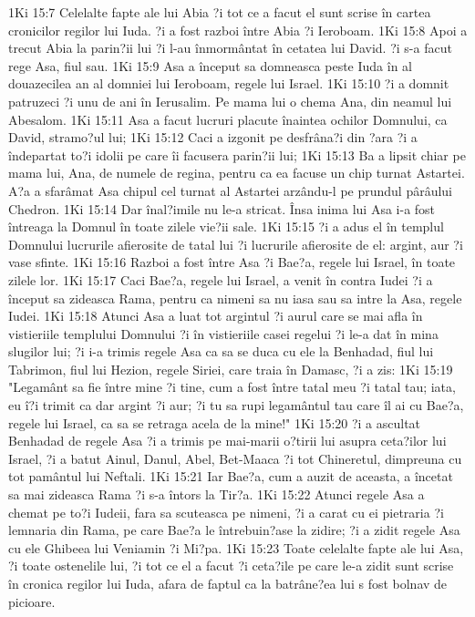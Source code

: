 1Ki 15:7  Celelalte fapte ale lui Abia ?i tot ce a facut el sunt scrise în cartea cronicilor regilor lui Iuda. ?i a fost razboi între Abia ?i Ieroboam.
1Ki 15:8  Apoi a trecut Abia la parin?ii lui ?i l-au înmormântat în cetatea lui David. ?i s-a facut rege Asa, fiul sau.
1Ki 15:9  Asa a început sa domneasca peste Iuda în al douazecilea an al domniei lui Ieroboam, regele lui Israel.
1Ki 15:10  ?i a domnit patruzeci ?i unu de ani în Ierusalim. Pe mama lui o chema Ana, din neamul lui Abesalom.
1Ki 15:11  Asa a facut lucruri placute înaintea ochilor Domnului, ca David, stramo?ul lui;
1Ki 15:12  Caci a izgonit pe desfrâna?i din ?ara ?i a îndepartat to?i idolii pe care îi facusera parin?ii lui;
1Ki 15:13  Ba a lipsit chiar pe mama lui, Ana, de numele de regina, pentru ca ea facuse un chip turnat Astartei. A?a a sfarâmat Asa chipul cel turnat al Astartei arzându-l pe prundul pârâului Chedron.
1Ki 15:14  Dar înal?imile nu le-a stricat. Însa inima lui Asa i-a fost întreaga la Domnul în toate zilele vie?ii sale.
1Ki 15:15  ?i a adus el în templul Domnului lucrurile afierosite de tatal lui ?i lucrurile afierosite de el: argint, aur ?i vase sfinte.
1Ki 15:16  Razboi a fost între Asa ?i Bae?a, regele lui Israel, în toate zilele lor.
1Ki 15:17  Caci Bae?a, regele lui Israel, a venit în contra Iudei ?i a început sa zideasca Rama, pentru ca nimeni sa nu iasa sau sa intre la Asa, regele Iudei.
1Ki 15:18  Atunci Asa a luat tot argintul ?i aurul care se mai afla în vistieriile templului Domnului ?i în vistieriile casei regelui ?i le-a dat în mina slugilor lui; ?i i-a trimis regele Asa ca sa se duca cu ele la Benhadad, fiul lui Tabrimon, fiul lui Hezion, regele Siriei, care traia în Damasc, ?i a zis:
1Ki 15:19  "Legamânt sa fie între mine ?i tine, cum a fost între tatal meu ?i tatal tau; iata, eu î?i trimit ca dar argint ?i aur; ?i tu sa rupi legamântul tau care îl ai cu Bae?a, regele lui Israel, ca sa se retraga acela de la mine!"
1Ki 15:20  ?i a ascultat Benhadad de regele Asa ?i a trimis pe mai-marii o?tirii lui asupra ceta?ilor lui Israel, ?i a batut Ainul, Danul, Abel, Bet-Maaca ?i tot Chineretul, dimpreuna cu tot pamântul lui Neftali.
1Ki 15:21  Iar Bae?a, cum a auzit de aceasta, a încetat sa mai zideasca Rama ?i s-a întors la Tir?a.
1Ki 15:22  Atunci regele Asa a chemat pe to?i Iudeii, fara sa scuteasca pe nimeni, ?i a carat cu ei pietraria ?i lemnaria din Rama, pe care Bae?a le întrebuin?ase la zidire; ?i a zidit regele Asa cu ele Ghibeea lui Veniamin ?i Mi?pa.
1Ki 15:23  Toate celelalte fapte ale lui Asa, ?i toate ostenelile lui, ?i tot ce el a facut ?i ceta?ile pe care le-a zidit sunt scrise în cronica regilor lui Iuda, afara de faptul ca la batrâne?ea lui s fost bolnav de picioare.
